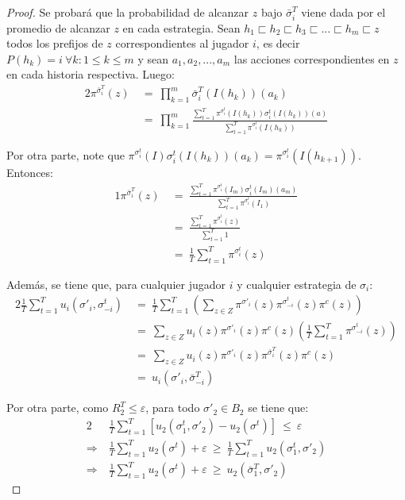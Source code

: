 \begin{proof}
Se probará que la probabilidad de alcanzar $z$ bajo $\bar{\sigma}_i^T$ viene dada por el promedio de alcanzar $z$ en cada estrategia. Sean $h_1 \sqsubset h_2 \sqsubset h_3 \sqsubset ... \sqsubset h_m \sqsubset z$ todos los prefijos de $z$ correspondientes al jugador $i$, es decir $P(h_k) = i\ \forall k : 1 \leq k \leq m$ y sean $a_1, a_2, ..., a_m$ las acciones correspondientes en $z$ en cada historia respectiva. Luego:
\begin{alignat}{2}
\pi^{\bar{\sigma}_i^T}(z)\ &=\ \prod_{k = 1}^m \bar{\sigma}_i^T(I(h_k))(a_k) \\	&=\ \prod_{k = 1}^m \frac{\sum_{t = 1}^{T}  \pi^{\sigma_i^t}(I(h_k))\sigma^t_i(I(h_k))(a)}{\sum_{t = 1}^T \pi^{\sigma_i^t}(I(h_k))}
\end{alignat}

Por otra parte, note que $\pi^{\sigma_i^t}(I)\sigma_i^t(I(h_k))(a_k) = \pi^{\sigma_i^t}(I(h_{k+1}))$. Entonces:
\begin{alignat}{1}
	\pi^{\bar{\sigma}_i^T}(z)\ &=\ \frac{\sum_{t = 1}^T\pi^{\sigma_i^t}(I_m) \sigma_i^t(I_m)(a_m)}{\sum_{t = 1}^T \pi^{\sigma_i^t}(I_1)} \\
	&=\ \frac{\sum_{t = 1}^T \pi^{\sigma_i^t}(z)}{\sum_{t = 1}^T 1} \\
	&=\ \frac{1}{T} \sum_{t = 1}^T \pi^{\sigma_i^t}(z)
\end{alignat}

Además, se tiene que, para cualquier jugador $i$ y cualquier estrategia de $\sigma_i$:
\begin{alignat}{2}
\frac{1}{T} \sum_{t = 1}^T u_i(\sigma'_i, \sigma_{-i}^t)\ &=\ \frac{1}{T} \sum_{t = 1}^T \left( \sum_{z \in Z} \pi^{\sigma'_i}(z) \pi^{\sigma_{-i}^t}(z) \pi^c(z) \right) \\
	&=\ \sum_{z \in Z} u_i(z) \pi^{\sigma'_i}(z) \pi^c(z) \left( \frac{1}{T} \sum_{t = 1}^T \pi^{\sigma_{-i}^t}(z) \right) \\
	&=\ \sum_{z \in Z} u_i(z) \pi^{\sigma'_i}(z) \pi^{\bar{\sigma}_i^T}(z) \pi^c(z) \\
	&=\ u_i(\sigma'_i, \bar{\sigma}_{-i}^T)
\end{alignat}

Por otra parte, como $R_2^T \leq \varepsilon$, para todo $\sigma'_2 \in B_2$ se tiene que:
\begin{alignat}{2}
	& \frac{1}{T} \sum_{t = 1}^T[u_2(\sigma_1^t, \sigma'_2) - u_2(\sigma^t)]\  \leq\  \varepsilon\\
	\Rightarrow\ & \frac{1}{T} \sum_{t = 1}^T u_2(\sigma^t) + \varepsilon\  \geq\  \frac{1}{T} \sum_{t = 1}^T u_2(\sigma_1^t, \sigma'_2) \\
	\Rightarrow\ & \frac{1}{T} \sum_{t = 1}^T u_2(\sigma^t) + \varepsilon\ \geq\ u_2(\bar{\sigma}_1^T, \sigma'_2)
\end{alignat}


\end{proof}
